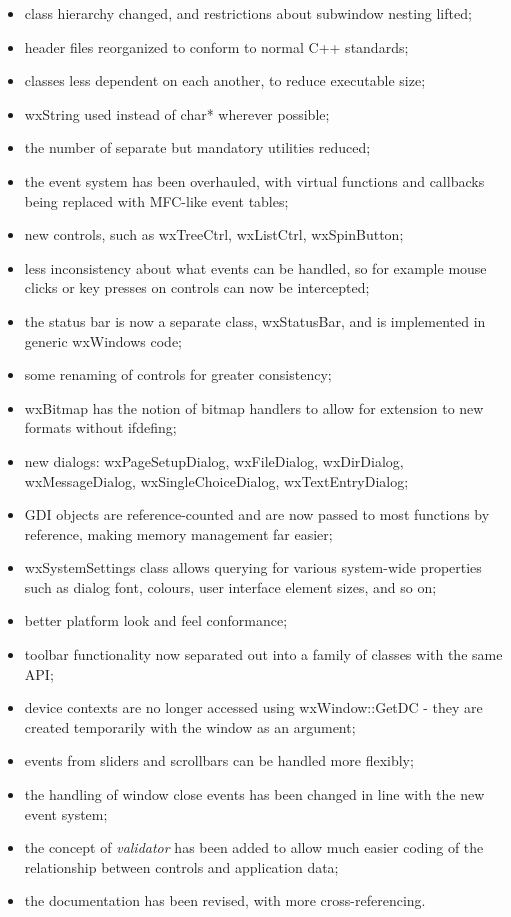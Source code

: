 \begin{itemize}\itemsep=0pt
\item class hierarchy changed, and restrictions about subwindow nesting lifted;
\item header files reorganized to conform to normal C++ standards;
\item classes less dependent on each another, to reduce executable size;
\item wxString used instead of char* wherever possible;
\item the number of separate but mandatory utilities reduced;
\item the event system has been overhauled, with
virtual functions and callbacks being replaced with MFC-like event tables;
\item new controls, such as wxTreeCtrl, wxListCtrl, wxSpinButton;
\item less inconsistency about what events can be handled, so for example
mouse clicks or key presses on controls can now be intercepted;
\item the status bar is now a separate class, wxStatusBar, and is
implemented in generic wxWindows code;
\item some renaming of controls for greater consistency;
\item wxBitmap has the notion of bitmap handlers to allow for extension to new formats
without ifdefing;
\item new dialogs: wxPageSetupDialog, wxFileDialog, wxDirDialog,
wxMessageDialog, wxSingleChoiceDialog, wxTextEntryDialog;
\item GDI objects are reference-counted and are now passed to most functions
by reference, making memory management far easier;
\item wxSystemSettings class allows querying for various system-wide properties
such as dialog font, colours, user interface element sizes, and so on;
\item better platform look and feel conformance;
\item toolbar functionality now separated out into a family of classes with the
same API;
\item device contexts are no longer accessed using wxWindow::GetDC - they are created
temporarily with the window as an argument;
\item events from sliders and scrollbars can be handled more flexibly;
\item the handling of window close events has been changed in line with the new
event system;
\item the concept of {\it validator} has been added to allow much easier coding of
the relationship between controls and application data;
\item the documentation has been revised, with more cross-referencing.
\end{itemize}

